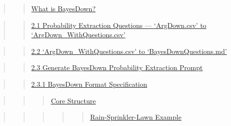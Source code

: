 \documentclass[
  letterpaper,
]{book}
\begin{document}
\begin{quote}
\begin{quote}
\hyperref[scrollTo=hWkmySZYNtzS]{What is BayesDown?}
\end{quote}
\end{quote}

\begin{quote}
\begin{quote}
\hyperref[scrollTo=WcF2nHXBZru4]{2.1 Probability Extraction Questions
--- `ArgDown.csv' to `ArgDown\_WithQuestions.csv'}
\end{quote}
\end{quote}

\begin{quote}
\begin{quote}
\hyperref[scrollTo=-q9UOQ8yaBZn]{2.2 `ArgDown\_WithQuestions.csv' to
`BayesDownQuestions.md'}
\end{quote}
\end{quote}

\begin{quote}
\begin{quote}
\hyperref[scrollTo=Ux4OUCPue6Bu]{2.3 Generate BayesDown Probability
Extraction Prompt}
\end{quote}
\end{quote}

\begin{quote}
\begin{quote}
\hyperref[scrollTo=ivcnd2ml41Nv]{2.3.1 BayesDown Format Specification}
\end{quote}
\end{quote}

\begin{quote}
\begin{quote}
\begin{quote}
\hyperref[scrollTo=ivcnd2ml41Nv]{Core Structure}
\end{quote}
\end{quote}
\end{quote}

\begin{quote}
\begin{quote}
\begin{quote}
\begin{quote}
\begin{quote}
\hyperref[scrollTo=Fn72WmgVEOH0]{Rain-Sprinkler-Lawn Example}
\end{quote}
\end{quote}
\end{quote}
\end{quote}
\end{quote}
\end{document}
